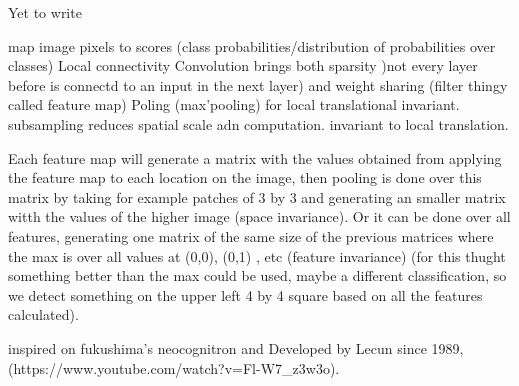 Yet to write

map image pixels to scores (class probabilities/distribution of probabilities over classes)
Local connectivity Convolution brings both sparsity )not every layer before is connectd to an input in the next layer) and weight sharing (filter thingy called feature map)
Poling (max'pooling) for local translational invariant. subsampling reduces spatial scale adn computation. invariant to local translation.

Each feature map will generate a matrix with the values obtained from applying the feature map to each location on the image, then pooling is done over this matrix by taking for example patches of 3 by 3 and generating an smaller matrix witth the values of the higher image (space invariance). Or it can be done over all features, generating one matrix of the same size of the previous matrices where the max is over all values at (0,0), (0,1) , etc (feature invariance) (for this thught something better than the max could be used, maybe a different classification, so we detect something on the upper left 4 by 4 square based on all the features calculated).

inspired on fukushima's neocognitron and Developed by Lecun since 1989, (https://www.youtube.com/watch?v=Fl-W7_z3w3o).


